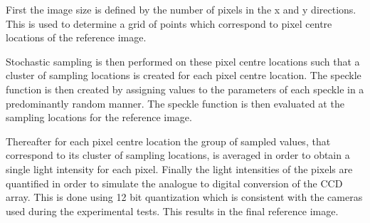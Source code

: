 \documentclass[12pt,oneside,openany,a4paper, %
english, %
masters-t, goldenblock]{usthesis}
\begin{document}
First the image size is defined by the number of pixels in the x and y directions. This is used to determine a grid of points which correspond to pixel centre locations of the reference image. 

Stochastic sampling is then performed on these pixel centre locations such that a cluster of sampling locations is created for each pixel centre location. The speckle function is then created by assigning values to the parameters of each speckle in a predominantly random manner. The speckle function is then evaluated at the sampling locations for the reference image. 

Thereafter for each pixel centre location the group of sampled values, that correspond to its cluster of sampling locations, is averaged in order to obtain a single light intensity for each pixel. Finally the light intensities of the pixels are quantified in order to simulate the analogue to digital conversion of the CCD array. This is done using 12 bit quantization which is consistent with the cameras used during the experimental tests. This results in the final reference image.
\end{document}
